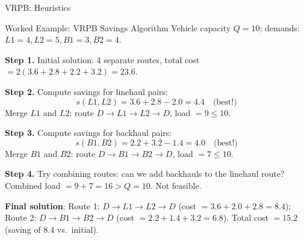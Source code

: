 \documentclass[aspectratio=169,10pt]{beamer}
\begin{document}
\begin{frame}[allowframebreaks]{VRPB: Heuristics}
\begin{exampleblock}{Worked Example: VRPB Savings Algorithm}
  Vehicle capacity $Q=10$; demands: $L1=4, L2=5, B1=3, B2=4$.

  \medskip
  \textbf{Step 1.}  Initial solution: 4 separate routes, total cost
  $= 2(3.6+2.8+2.2+3.2) = 23.6$.

  \medskip
  \textbf{Step 2.}  Compute savings for linehaul pairs:
  \[s(L1,L2) = 3.6+2.8-2.0 = 4.4 \quad \text{(best!)}
  \]
  Merge $L1$ and $L2$: route $D \to L1 \to L2 \to D$, load $=9 \leq 10$.

  \medskip
  \textbf{Step 3.}  Compute savings for backhaul pairs:
  \[s(B1,B2) = 2.2+3.2-1.4 = 4.0 \quad \text{(best!)}
  \]
  Merge $B1$ and $B2$: route $D \to B1 \to B2 \to D$, load $=7 \leq 10$.

  \medskip
  \textbf{Step 4.}  Try combining routes: can we add backhauls to the linehaul
  route?  Combined load $= 9+7=16 > Q=10$.  Not feasible.

  \medskip
  \textbf{Final solution}: Route 1: $D \to L1 \to L2 \to D$ (cost $=3.6+2.0+2.8=8.4$);
  Route 2: $D \to B1 \to B2 \to D$ (cost $=2.2+1.4+3.2=6.8$).
  Total cost $= 15.2$ (saving of $8.4$ vs.\ initial).
\end{exampleblock}

\end{frame}
\end{document}
